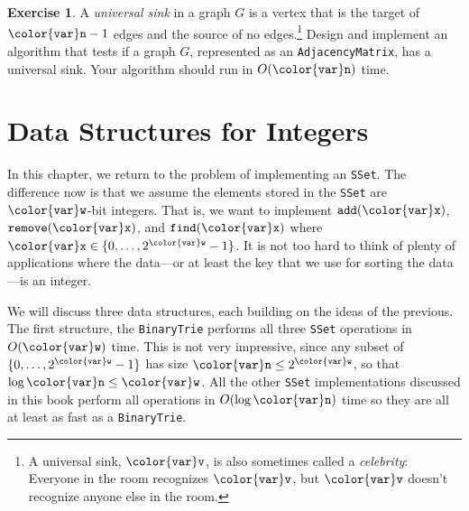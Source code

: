 \documentclass[10pt]{book}
\theoremstyle{plain}
\theoremstyle{definition}
\newtheorem{exc}{Exercise}[chapter]
\begin{document}
\begin{exc}
  A \emph{universal sink} in a graph $G$ is a vertex that is the target
  of $\ensuremath{\mathtt{{\color{var}n}}}-1$ edges and the source of no edges.\footnote{A universal sink,
  \ensuremath{\mathtt{{\color{var}v}}}, is also sometimes called a \emph{celebrity}: Everyone in the room
  recognizes \ensuremath{\mathtt{{\color{var}v}}}, but \ensuremath{\mathtt{{\color{var}v}}} doesn't recognize anyone else in the room.}
  Design and implement an algorithm that tests if a graph $G$, represented
  as an \texttt{AdjacencyMatrix}, has a universal sink.  Your algorithm should
  run in $O(\ensuremath{\mathtt{{\color{var}n}}})$ time.
\end{exc}




\clearpage

\clearpage
\chapter{Data Structures for Integers}

In this chapter, we return to the problem of implementing an \texttt{SSet}.
The difference now is that we assume the elements stored in the \texttt{SSet} are
\ensuremath{\mathtt{{\color{var}w}}}-bit integers.  That is, we want to implement \ensuremath{\mathtt{add({\color{var}x})}}, \ensuremath{\mathtt{remove({\color{var}x})}},
and \ensuremath{\mathtt{find({\color{var}x})}} where $\ensuremath{\mathtt{{\color{var}x}}}\in\{0,\ldots,2^{\ensuremath{\mathtt{{\color{var}w}}}}-1\}$.  It is not too hard
to think of plenty of applications where the data---or at least the key
that we use for sorting the data---is an integer.

We will discuss three data structures, each building on the ideas of
the previous.  The first structure, the \texttt{BinaryTrie} performs all three
\texttt{SSet} operations in $O(\ensuremath{\mathtt{{\color{var}w}}})$ time. This is not very impressive, since
any subset of $\{0,\ldots,2^{\ensuremath{\mathtt{{\color{var}w}}}}-1\}$ has size $\ensuremath{\mathtt{{\color{var}n}}}\le 2^{\ensuremath{\mathtt{{\color{var}w}}}}$, so that
$\log \ensuremath{\mathtt{{\color{var}n}}} \le \ensuremath{\mathtt{{\color{var}w}}}$.  All the other \texttt{SSet} implementations discussed in
this book perform all operations in $O(\log \ensuremath{\mathtt{{\color{var}n}}})$ time so they are all
at least as fast as a \texttt{BinaryTrie}.
\end{document}
